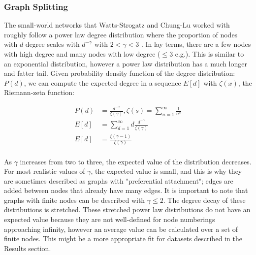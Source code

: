 \documentclass{article}
\begin{document}
\subsubsection{Graph Splitting}
The small-world networks that Watts-Strogatz and Chung-Lu worked with roughly follow a power law degree distribution where the proportion of nodes with $d$ degree scales with $d^{-\gamma}$ with $2 < \gamma < 3$ \cite{Chung:2004,Watts:1998}. In lay terms, there are a few nodes with high degree and many nodes with low degree ($\leq3$ e.g.). This is similar to an exponential distribution, however a power law distribution has a much longer and fatter tail. Given probability density function of the degree distribution: $P(d)$, we can compute the expected degree in a sequence $E[d]$ with $\zeta(x)$, the Riemann-zeta function:\\
\begin{spacing}{1}
\begin{align*}
P(d) & = \frac{d^{-\gamma}}{\zeta(\gamma)},               \zeta(s) = \sum_{n=1}^{\infty} \frac{1}{n^s}\\
E[d] & = \sum_{d=1}^{\infty} d \frac{d^{-\gamma}}{\zeta(\gamma)} \\
E[d] & = \frac{\zeta(\gamma-1)}{\zeta(\gamma)}\\ 
\end{align*}
\end{spacing}
As $\gamma$ increases from two to three, the expected value of the distribution decreases. For most realistic values of $\gamma$, the expected value is small, and this is why they are sometimes described as graphs with "preferential attachment"; edges are added between nodes that already have many edges. It is important to note that graphs with finite nodes can be described with $\gamma \leq 2$. The degree decay of these distributions is stretched. These stretched power law distributions do not have an expected value because they are not well-defined for node numberings approaching infinity, however an average value can be calculated over a set of finite nodes. This might be a more appropriate fit for datasets described in the Results section.\\
\end{document}
